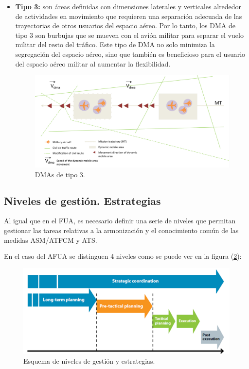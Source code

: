\begin{enumerate}
\begin{itemize}
        \item \textbf{Tipo 3:} son áreas definidas con dimensiones laterales y verticales alrededor de actividades en movimiento que requieren una separación adecuada de las trayectorias de otros usuarios del espacio aéreo. Por lo tanto, los DMA de tipo 3 son burbujas que se mueven con el avión militar para separar el vuelo militar del resto del tráfico. Este tipo de DMA no solo minimiza la segregación del espacio aéreo, sino que también es beneficioso para el usuario del espacio aéreo militar al aumentar la flexibilidad. 
        
        \begin{figure}[H]
            \centering
            \includegraphics[width=0.8\linewidth]{figuras/dma_3.png}
            \caption{DMAs de tipo 3.}
            \label{fig:dma_3}
        \end{figure}
    \end{itemize}
\end{enumerate}

\subsection{Niveles de gestión. Estrategias}

Al igual que en el FUA, es necesario definir una serie de niveles que permitan gestionar las tareas relativas a la armonización y el conocimiento común de las medidas ASM/ATFCM y ATS.

En el caso del AFUA se distinguen 4 niveles como se puede ver en la figura (\ref{fig:niveles}):

\begin{figure}[H]
    \centering
    \includegraphics[width=1\linewidth]{figuras/niveles.png}
    \caption{Esquema de niveles de gestión y estrategias.}
    \label{fig:niveles}
\end{figure}

